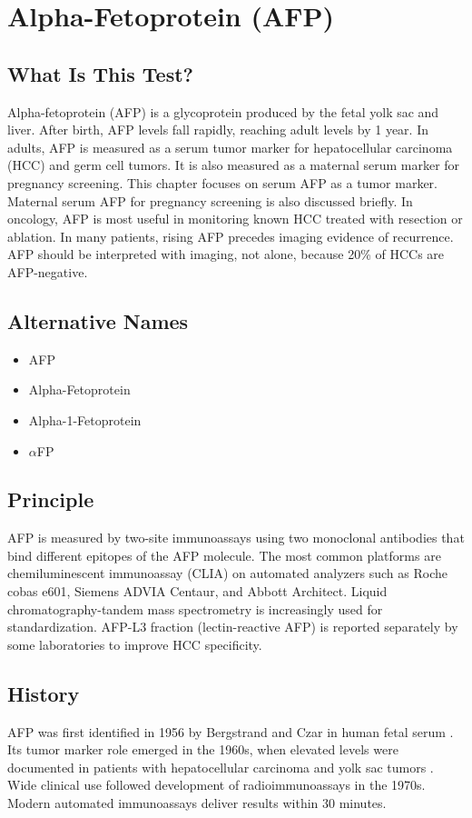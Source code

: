 \chapter{Alpha-Fetoprotein (AFP)}

\section*{What Is This Test?}
Alpha-fetoprotein (AFP) is a glycoprotein produced by the fetal yolk sac and liver. After birth, AFP levels fall rapidly, reaching adult levels by 1 year. In adults, AFP is measured as a serum tumor marker for hepatocellular carcinoma (HCC) and germ cell tumors. It is also measured as a maternal serum marker for pregnancy screening. This chapter focuses on serum AFP as a tumor marker. Maternal serum AFP for pregnancy screening is also discussed briefly. In oncology, AFP is most useful in monitoring known HCC treated with resection or ablation. In many patients, rising AFP precedes imaging evidence of recurrence. AFP should be interpreted with imaging, not alone, because 20\% of HCCs are AFP-negative.

\section*{Alternative Names}
\begin{itemize}
  \item AFP
  \item Alpha-Fetoprotein
  \item Alpha-1-Fetoprotein
  \item $\alpha$FP
\end{itemize}
\section*{Principle}
AFP is measured by two-site immunoassays using two monoclonal antibodies that bind different epitopes of the AFP molecule. The most common platforms are chemiluminescent immunoassay (CLIA) on automated analyzers such as Roche cobas e601, Siemens ADVIA Centaur, and Abbott Architect. Liquid chromatography-tandem mass spectrometry is increasingly used for standardization. AFP-L3 fraction (lectin-reactive AFP) is reported separately by some laboratories to improve HCC specificity.

\section*{History}
AFP was first identified in 1956 by Bergstrand and Czar in human fetal serum \cite{bergstrand1956demonstration}. Its tumor marker role emerged in the 1960s, when elevated levels were documented in patients with hepatocellular carcinoma and yolk sac tumors \cite{abelev1963production}. Wide clinical use followed development of radioimmunoassays in the 1970s. Modern automated immunoassays deliver results within 30 minutes.

